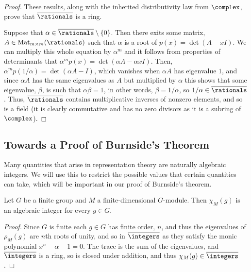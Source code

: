 \documentclass[fleqn]{NotesClass}
\DeclareMathOperator{\Mat}{Mat}
\newcommand{\algNumbers}{\overline{\rationals}}
\newcommand{\algIntegers}{\overline{\integers}}
\begin{document}
\begin{prp}{}{}
\begin{proof}
            These results, along with the inherited distributivity law from \(\complex\), prove that \(\algNumbers\) is a ring.
            
            \Step{\(\algNumbers\) is a Field}
            Suppose that \(\alpha \in \algNumbers \setminus \{0\}\).
            Then there exits some matrix, \(A \in \Mat_{m \times m}(\rationals)\) such that \(\alpha\) is a root of \(p(x) = \det(A - xI)\).
            We can multiply this whole equation by \(\alpha^m\) and it follows from properties of determinants that \(\alpha^m p(x) = \det(\alpha A - \alpha x I)\).
            Then, \(\alpha^m p(1/\alpha) = \det(\alpha A - I)\), which vanishes when \(\alpha A\) has eigenvalue \(1\), and since \(\alpha A\) has the same eigenvalues as \(A\) but multiplied by \(\alpha\) this shows that some eigenvalue, \(\beta\), is such that \(\alpha \beta = 1\), in other words, \(\beta = 1/\alpha\), so \(1/\alpha \in \algNumbers\).
            Thus, \(\algNumbers\) contains multiplicative inverses of nonzero elements, and so is a field  (it is clearly commutative and has no zero divisors as it is a subring of \(\complex\)).
        \end{proof}
    \end{prp}
    
    \subsection{Towards a Proof of Burnside's Theorem}
    Many quantities that arise in representation theory are naturally algebraic integers.
    We will use this to restrict the possible values that certain quantities can take, which will be important in our proof of Burnside's theorem.
    
    \begin{lma}{}{}
        Let \(G\) be a finite group and \(M\) a finite-dimensional \(G\)-module.
        Then \(\chi_M(g)\) is an algebraic integer for every \(g \in G\).
        \begin{proof}
            Since \(G\) is finite each \(g \in G\) has finite order, \(n\), and thus the eigenvalues of \(\rho_M(g)\) are \(n\)th roots of unity, and so in \(\algIntegers\) as they satisfy the monic polynomial \(x^n - \alpha - 1 = 0\).
            The trace is the sum of the eigenvalues, and \(\algIntegers\) is a ring, so is closed under addition, and thus \(\chi_M(g) \in \algIntegers\).
        \end{proof}
    \end{lma}
    
\end{document}
